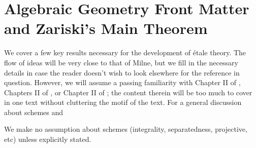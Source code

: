 \chapter{Algebraic Geometry Front Matter and Zariski's Main 
Theorem}
\label{sect_zariski}

We cover a few key results necessary for the development of 
\'etale theory. The flow of ideas will be very close to that of 
Milne, but we fill in the necessary details in case the reader 
doesn't wish to look elsewhere for the reference in question. 
However, we will assume a passing familiarity with Chapter II of 
\cite{Hart}, Chapters II of \cite{Liu}, or Chapter II of \cite{Mum}; the content therein 
will be too much to cover in one text without cluttering the motif 
of the text. For a general discussion about schemes and

We make no assumption about schemes (integrality, separatedness, 
projective, etc) unless explicitly stated. 

\begin{defn}
\end{defn}

